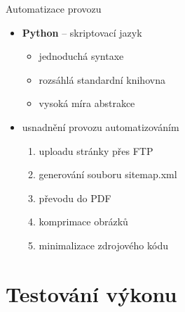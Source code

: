 \documentclass[14pt, hyperref={unicode}]{beamer}
\begin{document}
  \begin{frame}{Automatizace provozu}
    \begin{itemize}
      \item<+-> \textbf{Python} -- skriptovací jazyk
      \begin{itemize}
        \item<+-> jednoduchá syntaxe
        \item<+-> rozsáhlá standardní knihovna
        \item<+-> vysoká míra abstrakce
      \end{itemize}
    \end{itemize}

    \begin{itemize}
      \item<+-> usnadnění provozu automatizováním
      \begin{enumerate}[<+- | alert@+>]
        \item uploadu stránky přes FTP
        \item generování souboru sitemap.xml
        \item převodu do PDF
        \item komprimace obrázků
        \item minimalizace zdrojového kódu
      \end{enumerate}
    \end{itemize}
  \end{frame}

  \section{Testování výkonu}
\end{document}
